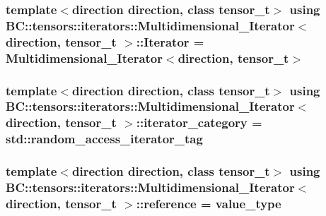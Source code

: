 \subsubsection[{\texorpdfstring{Iterator}{Iterator}}]{\setlength{\rightskip}{0pt plus 5cm}template$<$direction direction, class tensor\+\_\+t$>$ using {\bf B\+C\+::tensors\+::iterators\+::\+Multidimensional\+\_\+\+Iterator}$<$ {\bf direction}, tensor\+\_\+t $>$\+::{\bf Iterator} =  {\bf Multidimensional\+\_\+\+Iterator}$<${\bf direction}, tensor\+\_\+t$>$}\hypertarget{structBC_1_1tensors_1_1iterators_1_1Multidimensional__Iterator_a4b21637f176748500fff232ca13fe2bb}{}\label{structBC_1_1tensors_1_1iterators_1_1Multidimensional__Iterator_a4b21637f176748500fff232ca13fe2bb}
\subsubsection[{\texorpdfstring{iterator\+\_\+category}{iterator_category}}]{\setlength{\rightskip}{0pt plus 5cm}template$<$direction direction, class tensor\+\_\+t$>$ using {\bf B\+C\+::tensors\+::iterators\+::\+Multidimensional\+\_\+\+Iterator}$<$ {\bf direction}, tensor\+\_\+t $>$\+::{\bf iterator\+\_\+category} =  std\+::random\+\_\+access\+\_\+iterator\+\_\+tag}\hypertarget{structBC_1_1tensors_1_1iterators_1_1Multidimensional__Iterator_af1894bf9eea6a7a889a347392c2c2fd1}{}\label{structBC_1_1tensors_1_1iterators_1_1Multidimensional__Iterator_af1894bf9eea6a7a889a347392c2c2fd1}
\subsubsection[{\texorpdfstring{reference}{reference}}]{\setlength{\rightskip}{0pt plus 5cm}template$<$direction direction, class tensor\+\_\+t$>$ using {\bf B\+C\+::tensors\+::iterators\+::\+Multidimensional\+\_\+\+Iterator}$<$ {\bf direction}, tensor\+\_\+t $>$\+::{\bf reference} =  {\bf value\+\_\+type}}\hypertarget{structBC_1_1tensors_1_1iterators_1_1Multidimensional__Iterator_a7273dce25bbc3709f40b187bafd73832}{}\label{structBC_1_1tensors_1_1iterators_1_1Multidimensional__Iterator_a7273dce25bbc3709f40b187bafd73832}
